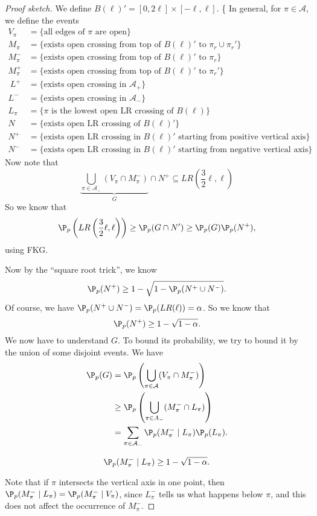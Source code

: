 \documentclass[a4paper]{article}
\begin{document}
\begin{proof}[Proof sketch]
  We define $B(\ell)' = [0, 2\ell] \times [-\ell, \ell]$.
\{
  In general, for $\pi \in \mathcal{A}$, we define the events
  \begin{align*}
    V_\pi &= \{\text{all edges of $\pi$ are open}\}\\
    M_\pi &= \{\text{exists open crossing from top of $B(\ell)'$ to $\pi_r \cup \pi_r'$}\}\\
    M_\pi^- &= \{\text{exists open crossing from top of $B(\ell)'$ to $\pi_r$}\}\\
    M_\pi^+ &= \{\text{exists open crossing from top of $B(\ell)'$ to $\pi_r'$}\}\\\
    L^+ &= \{\text{exists open crossing in $\mathcal{A}_+$}\}\\
    L^- &= \{\text{exists open crossing in $\mathcal{A}_-$}\}\\
    L_\pi &= \{\text{$\pi$ is the lowest open LR crossing of $B(\ell)$}\}\\
    N &= \{\text{exists open LR crossing of $B(\ell)'$}\}\\
    N^+ &= \{\text{exists open LR crossing in $B(\ell)'$ starting from positive vertical axis}\}\\
    N^- &= \{\text{exists open LR crossing in $B(\ell)'$ starting from negative vertical axis}\}
  \end{align*}
  Now note that
  \[
    \underbrace{\bigcup_{\pi \in \mathcal{A}_-}(V_\pi \cap M_{\pi}^-)}_{G} \cap N^+ \subseteq LR\left(\frac{3}{2} \ell, \ell\right)
  \]
  So we know that
  \[
    \P_p\left(LR\left(\frac{3}{2}\ell, \ell\right)\right) \geq \P_p(G \cap N') \geq \P_p(G) \P_p(N^+),
  \]
  using FKG.

  Now by the ``square root trick'', we know
  \[
    \P_p(N^+) \geq 1 - \sqrt{1 - \P_p(N^+ \cup N^-)}.
  \]
  Of course, we have $\P_p(N^+ \cup N^-) = \P_p(LR(\ell)) = \alpha$. So we know that
  \[
    \P_p(N^+) \geq 1 - \sqrt{1 - \alpha}.
  \]
  We now have to understand $G$. To bound its probability, we try to bound it by the union of some disjoint events. We have
  \begin{align*}
    \P_p(G) &= \P_p\left(\bigcup_{\pi \in \mathcal{A}} (V_\pi \cap M_\pi^-)\right)\\
    &\geq \P_p\left(\bigcup_{\pi \in A_-} (M_\pi^- \cap L_\pi)\right)\\
    &= \sum_{\pi \in \mathcal{A}_-} \P_p(M_\pi^- \mid L_\pi) \P_p(L_\pi).
  \end{align*}
  \begin{claim}
    \[
      \P_p(M_\pi^- \mid L_\pi) \geq 1 - \sqrt{1 - \alpha}.
    \]
  \end{claim}
  Note that if $\pi$ intersects the vertical axis in one point, then $\P_p(M_\pi^- \mid L_\pi) = \P_p(M_\pi^- \mid V_\pi)$, since $L_\pi^-$ tells us what happens below $\pi$, and this does not affect the occurrence of $M_\pi^-$.


\end{proof}
\end{document}
